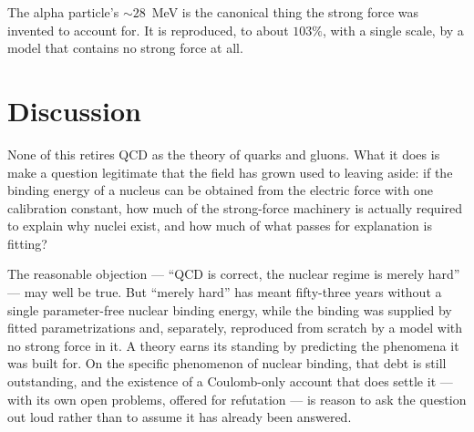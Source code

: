 \documentclass[11pt]{article}
\begin{document}
The alpha particle's $\sim 28$~MeV is the canonical thing the strong force was invented to account for.
It is reproduced, to about $103\%$, with a single scale, by a model that contains no strong force at all.

\section{Discussion}
\label{sec:discussion}

None of this retires QCD as the theory of quarks and gluons. What it does is make a question legitimate
that the field has grown used to leaving aside: if the binding energy of a nucleus can be obtained from
the electric force with one calibration constant, how much of the strong-force machinery is actually
required to explain why nuclei exist, and how much of what passes for explanation is fitting?

The reasonable objection --- ``QCD is correct, the nuclear regime is merely hard'' --- may well be true.
But ``merely hard'' has meant fifty-three years without a single parameter-free nuclear binding energy,
while the binding was supplied by fitted parametrizations and, separately, reproduced from scratch by a
model with no strong force in it. A theory earns its standing by predicting the phenomena it was built
for. On the specific phenomenon of nuclear binding, that debt is still outstanding, and the existence of
a Coulomb-only account that does settle it --- with its own open problems, offered for refutation ---
is reason to ask the question out loud rather than to assume it has already been answered.
\end{document}
